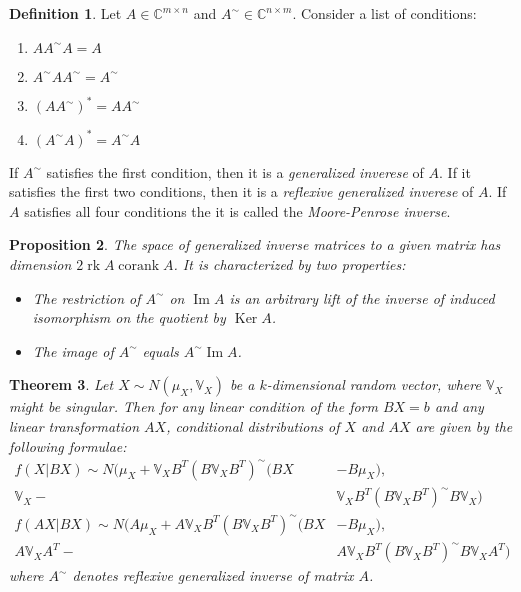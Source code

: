 \documentclass[12pt]{article}
\newtheorem{theorem}{Theorem}[section]
\newtheorem{proposition}[theorem]{Proposition}
\theoremstyle{definition}
\newtheorem{definition}[theorem]{Definition}
\theoremstyle{remark}
\numberwithin{equation}{section}
\newcommand{\CC}{\mathbb{C}}
\newcommand{\VV}{\mathbb{V}}
\begin{document}
\begin{definition}
	Let $A\in\CC^{m\times n}$ and $A^{\sim}\in \CC^{n\times m}$. Consider a list of conditions:
	\begin{enumerate}
		\item $AA^{\sim}A = A$
		\item $A^{\sim}AA^{\sim} = A^{\sim}$
		\item $(AA^{\sim})^* = AA^{\sim}$
		\item $(A^{\sim}A)^* = A^{\sim}A$
	\end{enumerate}
	If $A^{\sim}$ satisfies the first condition, then it is a \emph{generalized inverese} of $A$. If it satisfies the first two conditions, then it is a \emph{reflexive generalized inverese} of $A$. If $A$ satisfies all four conditions the it is called the \emph{Moore-Penrose inverse}.
\end{definition}

\begin{proposition}
	The space of generalized inverse matrices to a given matrix has dimension $2 \operatorname{rk}A\operatorname{corank}A$. It is characterized by two properties:
	\begin{itemize}
		\item The restriction of $A^{\sim}$ on $\operatorname{Im}A$ is an arbitrary lift of the inverse of induced isomorphism on the quotient by $\operatorname{Ker}A$.
		\item The image of $A^{\sim}$ equals $A^{\sim} \operatorname{Im}A$.
	\end{itemize}
\end{proposition}

\begin{theorem}
	Let $X\sim N(\mu_X, \VV_X)$ be a $k$-dimensional random vector, where $\VV_X$ might be singular. Then for any linear condition of the form $BX = b$ and any linear transformation $AX$, conditional distributions of $X$ and $AX$ are given by the following formulae:
	\begin{align*}
		f(X|BX) \sim N(\mu_X + \VV_XB^T(B\VV_XB^T)^{\sim}(BX& - B\mu_X),\\ \VV_X - &\VV_XB^T(B\VV_XB^T)^{\sim}B\VV_X)\\
		f(AX|BX) \sim N(A\mu_X + A\VV_XB^T(B\VV_XB^T)^{\sim}(BX& - B\mu_X),\\ A\VV_XA^T - &A\VV_XB^T(B\VV_XB^T)^{\sim}B\VV_XA^T)
	\end{align*}
	where $A^{\sim}$ denotes reflexive generalized inverse of matrix $A$.
\end{theorem}
\end{document}
